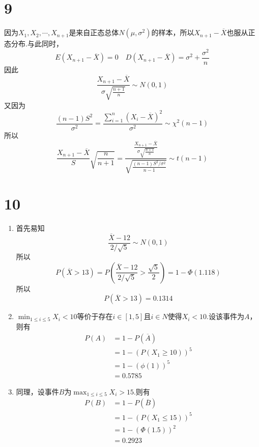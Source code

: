 \documentclass[twocolumn]{article}
\begin{document}
\begin{CJK}{UTF8}{gbsn}
			\section*{9}
				因为$X_1,X_2,\cdots,X_{n+1}$是来自正态总体$N(\mu,\sigma^2)$的样本，所以$X_{n+1}-\overline{X}$也服从正态分布.与此同时，\[E(X_{n+1}-\overline{X})=0\quad D(X_{n+1}-\overline{X})=\sigma^2+\frac{\sigma^2}{n}\]因此\[\frac{X_{n+1}-\overline{X}}{\sigma\sqrt{\frac{n+1}{n}}}\sim N(0,1)\]又因为\[\frac{(n-1)S^2}{\sigma^2}=\frac{\sum_{i=1}^{n}(X_i-\overline{X})^2}{\sigma^2}\sim \chi^2(n-1)\]
				所以\[\frac{X_{n+1}-\overline{X}}{S}\sqrt{\frac{n}{n+1}}=\frac{\frac{X_{n+1}-\overline{X}}{\sigma\sqrt{\frac{n+1}{n}}}}{\sqrt{\frac{(n-1)S^2/\sigma^2}{n-1}}}\sim t(n-1)\]
			\section*{10}
				\begin{enumerate}[(1)]
					\item 首先易知\[\frac{\overline{X}-12}{2/\sqrt{5}}\sim N(0,1)\]所以\[P(\overline{X}>13)=P(\frac{\overline{X}-12}{2/\sqrt{5}}>\frac{\sqrt{5}}{2})=1-\Phi(1.118)\]所以\[P(\overline{X}>13)=0.1314\]
					\item $\min_{1\le i\le5}X_i<10$等价于存在$i\in[1,5]$且$i\in N$使得$X_i<10$.设该事件为$A$，则有\begin{align*}
						P(A) & = 1-P(\overline{A})\\
						& = 1-(P(X_1\ge10))^5\\
						& = 1-(\phi(1))^5\\
						& = 0.5785
					\end{align*}
					\item 同理，设事件$B$为$\max_{1\le i\le5}X_i>15$.则有\begin{align*}
						P(B) & = 1-P(\overline{B})\\
						& = 1-(P(X_1\le15))^5\\
						& = 1-(\Phi(1.5))^2\\
						& = 0.2923
					\end{align*}
				\end{enumerate}

\end{CJK}
\end{document}
